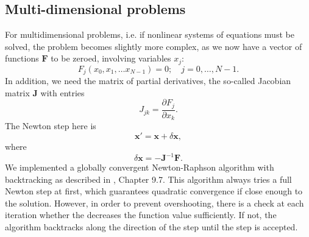 \documentclass[a4paper,11pt]{article}
\def\F{\boldsymbol{F}}
\def\J{\boldsymbol{J}}
\def\x{\boldsymbol{x}}
\begin{document}
\subsection{Multi-dimensional problems}
For multidimensional problems, i.e. if nonlinear
systems of equations must be solved, the problem becomes slightly more complex, as we now have a vector of functions $\F$ to be zeroed, involving variables $x_j$:
\begin{equation*}
 F_j(x_0, x_1, \ldots x_{N-1}) = 0; \quad j = 0, \ldots, N-1.
\end{equation*}
In addition, we need the matrix of partial derivatives, the so-called Jacobian matrix $\J$ with entries
\begin{equation*}
 J_{jk} = \frac{\partial F_j}{\partial x_k}.
\end{equation*}
The Newton step here is
\begin{equation*}
 \x' =  \x + \delta \x,
\end{equation*}
where
\begin{equation*}
 \delta \x = -\J^{-1} \F.
\end{equation*}
We implemented a globally convergent Newton-Raphson algorithm with backtracking as described in \cite{Press2007}, Chapter 9.7. This algorithm always tries a full Newton step at first, which guarantees quadratic convergence if close enough to the solution. However, in order to prevent overshooting, there is a check at each iteration whether the decreases the function value sufficiently. If not, the algorithm backtracks along the direction of the step until the step is accepted.
\end{document}
